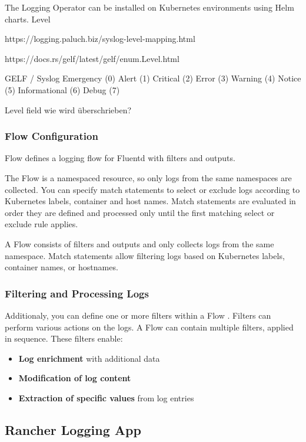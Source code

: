 \documentclass[../main.tex]{subfiles}
\begin{document}
The Logging Operator can be installed on Kubernetes environments using Helm charts.
Level

https://logging.paluch.biz/syslog-level-mapping.html

https://docs.rs/gelf/latest/gelf/enum.Level.html

GELF / Syslog
Emergency (0)
Alert (1)
Critical (2)
Error (3)
Warning (4)
Notice (5)
Informational (6)
Debug (7)

Level field wie wird überschrieben?

\subsubsection{Flow Configuration}

Flow defines a logging flow for Fluentd with filters and outputs.

The Flow is a namespaced resource, so only logs from the same namespaces are collected. You can specify match statements to select or exclude logs according to Kubernetes labels, container and host names. Match statements are evaluated in order they are defined and processed only until the first matching select or exclude rule applies. 

A Flow consists of filters and outputs and only collects logs from the same namespace. Match statements allow filtering logs based on Kubernetes labels, container names, or hostnames. 

\subsubsection{Filtering and Processing Logs}

Additionaly, you can define one or more filters within a Flow \cite{fluentdfilters}. Filters can perform various actions on the logs. A Flow can contain multiple filters, applied in sequence. These filters enable:

\begin{itemize}
    \item \textbf{Log enrichment} with additional data
    \item \textbf{Modification of log content}
    \item \textbf{Extraction of specific values} from log entries
\end{itemize}


\subsection{Rancher Logging App}
\end{document}

